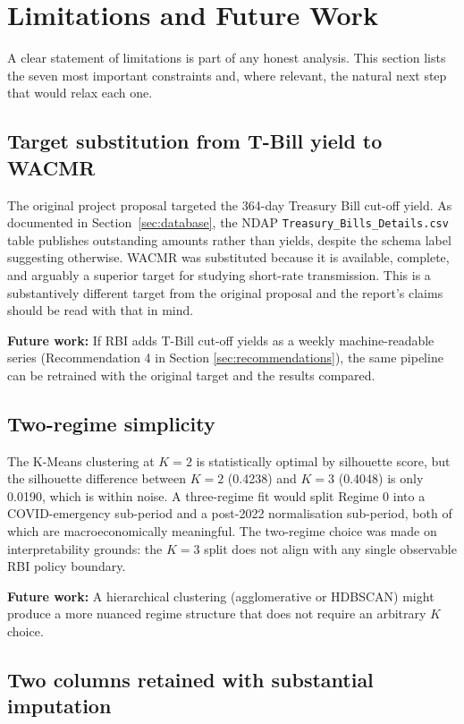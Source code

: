 \section{Limitations and Future Work}
\label{sec:limitations}

A clear statement of limitations is part of any honest analysis.
This section lists the seven most important constraints and, where
relevant, the natural next step that would relax each one.

\subsection{Target substitution from T-Bill yield to WACMR}

The original project proposal targeted the 364-day Treasury Bill
cut-off yield. As documented in Section~\ref{sec:database}, the NDAP
\texttt{Treasury\_Bills\_Details.csv} table publishes outstanding
amounts rather than yields, despite the schema label suggesting
otherwise. WACMR was substituted because it is available, complete,
and arguably a superior target for studying short-rate transmission.
This is a substantively different target from the original proposal
and the report's claims should be read with that in mind.

\textbf{Future work:} If RBI adds T-Bill cut-off yields as a weekly
machine-readable series (Recommendation 4 in Section
\ref{sec:recommendations}), the same pipeline can be retrained with
the original target and the results compared.

\subsection{Two-regime simplicity}

The K-Means clustering at $K=2$ is statistically optimal by silhouette
score, but the silhouette difference between $K=2$ (0.4238) and
$K=3$ (0.4048) is only 0.0190, which is within noise. A three-regime
fit would split Regime 0 into a COVID-emergency sub-period and a
post-2022 normalisation sub-period, both of which are macroeconomically
meaningful. The two-regime choice was made on interpretability grounds:
the $K=3$ split does not align with any single observable RBI policy
boundary.

\textbf{Future work:} A hierarchical clustering (agglomerative or HDBSCAN)
might produce a more nuanced regime structure that does not require an
arbitrary $K$ choice.

\subsection{Two columns retained with substantial imputation}

